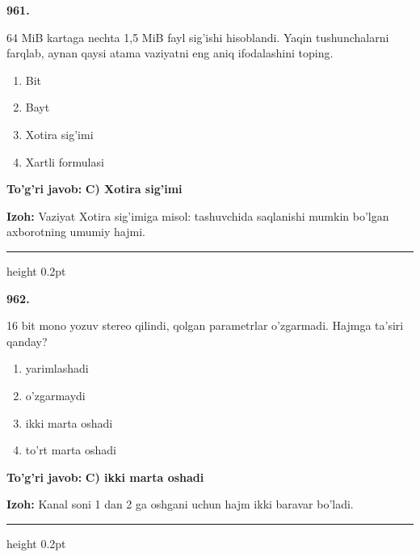 \documentclass[10pt,a4paper,oneside]{article}
\begin{document}
\noindent\textbf{\color{ink}961.}
\par
64 MiB kartaga nechta 1,5 MiB fayl sig'ishi hisoblandi. Yaqin tushunchalarni farqlab, aynan qaysi atama vaziyatni eng aniq ifodalashini toping.
\begin{enumerate}[label=\Alph*),leftmargin=9mm]
\item Bit
\item Bayt
\item Xotira sig'imi
\item Xartli formulasi
\end{enumerate}
\begin{tcolorbox}[enhanced,breakable,colback=teal!4,colframe=teal!50!black,boxrule=0.5pt,arc=1.1mm,left=3mm,right=3mm,top=1.7mm,bottom=1.7mm,before skip=2mm,after skip=2mm]
\textbf{\color{teal}To'g'ri javob:} \textbf{C) Xotira sig'imi}
\par\smallskip
\textbf{Izoh:} Vaziyat Xotira sig'imiga misol: tashuvchida saqlanishi mumkin bo'lgan axborotning umumiy hajmi.
\end{tcolorbox}
\vspace{2mm}\hrule height 0.2pt \vspace{3mm}

\noindent\textbf{\color{ink}962.}
\par
16 bit mono yozuv stereo qilindi, qolgan parametrlar o'zgarmadi. Hajmga ta'siri qanday?
\begin{enumerate}[label=\Alph*),leftmargin=9mm]
\item yarimlashadi
\item o'zgarmaydi
\item ikki marta oshadi
\item to'rt marta oshadi
\end{enumerate}
\begin{tcolorbox}[enhanced,breakable,colback=teal!4,colframe=teal!50!black,boxrule=0.5pt,arc=1.1mm,left=3mm,right=3mm,top=1.7mm,bottom=1.7mm,before skip=2mm,after skip=2mm]
\textbf{\color{teal}To'g'ri javob:} \textbf{C) ikki marta oshadi}
\par\smallskip
\textbf{Izoh:} Kanal soni 1 dan 2 ga oshgani uchun hajm ikki baravar bo'ladi.
\end{tcolorbox}
\vspace{2mm}\hrule height 0.2pt \vspace{3mm}
\end{document}
